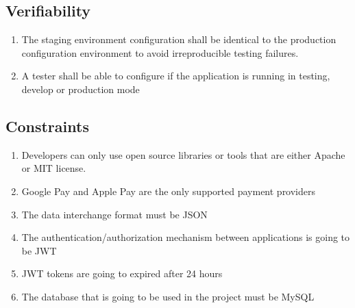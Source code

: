 \subsection{Verifiability}
\begin{enumerate}[label=VER-\arabic*]
    \item The staging environment configuration shall be identical to the 
    production configuration environment to avoid irreproducible 
    testing failures.
    \item A tester shall be able to configure if the application is 
    running in testing, develop or production mode
\end{enumerate}
\pagebreak
\subsection{Constraints}
\begin{enumerate}[label=CON-\arabic*]
    \item Developers can only use open source libraries or tools that are 
    either Apache or MIT license.
    \item Google Pay and Apple Pay are the only supported payment providers
    \item The data interchange format must be JSON
    \item The authentication/authorization mechanism between applications 
    is going to be JWT
    \item JWT tokens are going to expired after 24 hours
    \item The database that is going to be used in the project must be MySQL
\end{enumerate}
\pagebreak